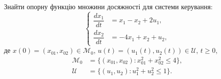     

\begin{problem}
Знайти опорну функцію множини досяжності для системи керування:
\begin{equation*}
    \left\{
    \begin{aligned}
    \dfrac{dx_1}{dt} &= x_1 - x_2 + 2u_1, \\
    \dfrac{dx_2}{dt} &= -4x_1 + x_2 + u_2,
    \end{aligned}
    \right.
\end{equation*}
де $x(0) = (x_{01}, x_{02}) \in \mathcal{M}_0$, $u(t) = (u_1(t), u_2(t)) \in\mathcal{U}$, $t\ge0$,
\begin{align*}
    \mathcal{M}_0 &= \{(x_{01},x_{02}): x_{01}^2 + x_{02}^2 \le 4\}, \\
    \mathcal{U} &= \{(u_1, u_2): u_1^2 + u_2^2 \le 1\}.
\end{align*}
\end{problem}


    

